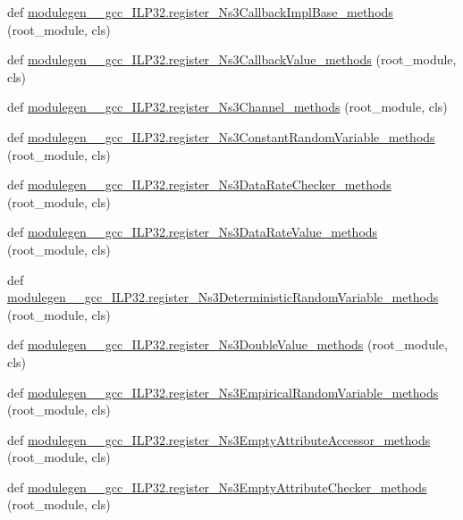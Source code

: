 \begin{DoxyCompactItemize}
\item 
def \hyperlink{namespacemodulegen____gcc__ILP32_a9a85026102c692583453c9b637b8b837}{modulegen\+\_\+\+\_\+gcc\+\_\+\+I\+L\+P32.\+register\+\_\+\+Ns3\+Callback\+Impl\+Base\+\_\+methods} (root\+\_\+module, cls)
\item 
def \hyperlink{namespacemodulegen____gcc__ILP32_a08e2760d3ccd91256fbce9ef63b1e10b}{modulegen\+\_\+\+\_\+gcc\+\_\+\+I\+L\+P32.\+register\+\_\+\+Ns3\+Callback\+Value\+\_\+methods} (root\+\_\+module, cls)
\item 
def \hyperlink{namespacemodulegen____gcc__ILP32_ae5495d57da47c2b867b78489fd5168e0}{modulegen\+\_\+\+\_\+gcc\+\_\+\+I\+L\+P32.\+register\+\_\+\+Ns3\+Channel\+\_\+methods} (root\+\_\+module, cls)
\item 
def \hyperlink{namespacemodulegen____gcc__ILP32_a42c81b9cd2cbe5e8e49f81b203911b61}{modulegen\+\_\+\+\_\+gcc\+\_\+\+I\+L\+P32.\+register\+\_\+\+Ns3\+Constant\+Random\+Variable\+\_\+methods} (root\+\_\+module, cls)
\item 
def \hyperlink{namespacemodulegen____gcc__ILP32_a29fce5b90bb63029c10e1f6c31445ef8}{modulegen\+\_\+\+\_\+gcc\+\_\+\+I\+L\+P32.\+register\+\_\+\+Ns3\+Data\+Rate\+Checker\+\_\+methods} (root\+\_\+module, cls)
\item 
def \hyperlink{namespacemodulegen____gcc__ILP32_ae9a5e4f1c8744f24232f30ba6195316c}{modulegen\+\_\+\+\_\+gcc\+\_\+\+I\+L\+P32.\+register\+\_\+\+Ns3\+Data\+Rate\+Value\+\_\+methods} (root\+\_\+module, cls)
\item 
def \hyperlink{namespacemodulegen____gcc__ILP32_a863c4172668c4be59165816ab68bf4ea}{modulegen\+\_\+\+\_\+gcc\+\_\+\+I\+L\+P32.\+register\+\_\+\+Ns3\+Deterministic\+Random\+Variable\+\_\+methods} (root\+\_\+module, cls)
\item 
def \hyperlink{namespacemodulegen____gcc__ILP32_a655ce0a1b19f17b677a9ccff35c632fd}{modulegen\+\_\+\+\_\+gcc\+\_\+\+I\+L\+P32.\+register\+\_\+\+Ns3\+Double\+Value\+\_\+methods} (root\+\_\+module, cls)
\item 
def \hyperlink{namespacemodulegen____gcc__ILP32_a6446c81f0f288423f8095c58812c96a6}{modulegen\+\_\+\+\_\+gcc\+\_\+\+I\+L\+P32.\+register\+\_\+\+Ns3\+Empirical\+Random\+Variable\+\_\+methods} (root\+\_\+module, cls)
\item 
def \hyperlink{namespacemodulegen____gcc__ILP32_a489a942ef59028089c93b9dea61069a3}{modulegen\+\_\+\+\_\+gcc\+\_\+\+I\+L\+P32.\+register\+\_\+\+Ns3\+Empty\+Attribute\+Accessor\+\_\+methods} (root\+\_\+module, cls)
\item 
def \hyperlink{namespacemodulegen____gcc__ILP32_a46ed8d8e239b38c1a4353a533fcb77a2}{modulegen\+\_\+\+\_\+gcc\+\_\+\+I\+L\+P32.\+register\+\_\+\+Ns3\+Empty\+Attribute\+Checker\+\_\+methods} (root\+\_\+module, cls)

\end{DoxyCompactItemize}
